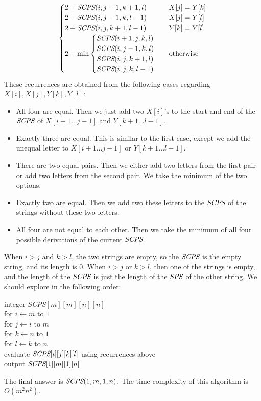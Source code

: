 \documentclass[11pt]{article}
\begin{document}
\begin{solution}
\begin{enumerate}[(a)]
\begin{equation*}
\begin{cases}
	2+\emph{SCPS}(i,j-1,k+1,l) &X[j]=Y[k]\\
	2+\emph{SCPS}(i,j-1,k,l-1) &X[j]=Y[l]\\
	2+\emph{SCPS}(i,j,k+1,l-1) &Y[k]=Y[l]\\
	2+\min
	\begin{cases}
		\emph{SCPS}(i+1,j,k,l)\\
		\emph{SCPS}(i,j-1,k,l)\\
		\emph{SCPS}(i,j,k+1,l)\\
		\emph{SCPS}(i,j,k,l-1)\\
	\end{cases}
	&\text{otherwise}
\end{cases}
\end{equation*}
These recurrences are obtained from the following cases regarding $X[i], X[j], Y[k], Y[l]$:
\begin{itemize}
\item All four are equal. Then we just add two $X[i]$'s to the start and end of the $\emph{SCPS}$ of $X[i+1...j-1]$ and $Y[k+1...l-1]$.
\item Exactly three are equal. This is similar to the first case, except we add the unequal letter to $X[i+1...j-1]$ or $Y[k+1...l-1]$.
\item There are two equal pairs. Then we either add two letters from the first pair or add two letters from the second pair. We take the minimum of the two options.
\item Exactly two are equal. Then we add two these letters to the $\emph{SCPS}$ of the strings without these two letters.
\item All four are not equal to each other. Then we take the minimum of all four possible derivations of the current $\emph{SCPS}$.
\end{itemize}
When $i>j$ and $k>l$, the two strings are empty, so the $\emph{SCPS}$ is the empty string, and its length is $0$. When $i>j$ or $k>l$, then one of the strings is empty, and the length of the $\emph{SCPS}$ is just the length of the $\emph{SPS}$ of the other string. We should explore in the following order:
\begin{algo}
	integer \emph{SCPS}$[m][m][n][n]$
\\	for $i\gets m$ to $1$\+
\\	for $j\gets i$ to $m$\+
\\	for $k\gets n$ to $1$\+
\\	for $l\gets k$ to $n$\+
\\	evaluate $\emph{SCPS}[i][j][k][l]$ using recurrences above\-\-\-\-
\\	output $\emph{SCPS}[1][m][1][n]$
\end{algo}
The final answer is $\emph{SCPS}(1,m,1,n)$. The time complexity of this algorithm is $O(m^2n^2)$.
\end{enumerate}
\end{solution}
\end{document}
